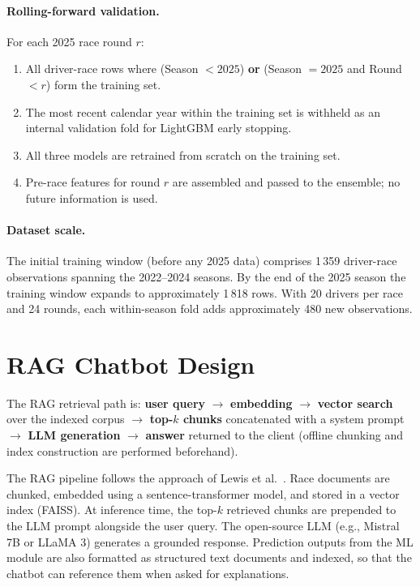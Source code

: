 \documentclass[12pt, a4paper, oneside]{report}
\begin{document}
\paragraph{Rolling-forward validation.}
For each 2025 race round $r$:
\begin{enumerate}[leftmargin=*]
  \item All driver-race rows where (Season $< 2025$) \textbf{or}
        (Season $= 2025$ and Round $< r$) form the training set.
  \item The most recent calendar year within the training set is withheld as
        an internal validation fold for LightGBM early stopping.
  \item All three models are retrained from scratch on the training set.
  \item Pre-race features for round $r$ are assembled and passed to the
        ensemble; no future information is used.
\end{enumerate}

\paragraph{Dataset scale.}
The initial training window (before any 2025 data) comprises 1\,359 driver-race
observations spanning the 2022--2024 seasons. By the end of the 2025 season the
training window expands to approximately 1\,818 rows. With 20 drivers per race
and 24 rounds, each within-season fold adds approximately 480 new observations.

\section{RAG Chatbot Design}

The RAG retrieval path is: \textbf{user query} $\rightarrow$ \textbf{embedding}
$\rightarrow$ \textbf{vector search} over the indexed corpus $\rightarrow$
\textbf{top-$k$ chunks} concatenated with a system prompt $\rightarrow$
\textbf{LLM generation} $\rightarrow$ \textbf{answer} returned to the client
(offline chunking and index construction are performed beforehand).

The RAG pipeline follows the approach of Lewis et al.~\cite{lewisRAG2020}.
Race documents are chunked, embedded using a sentence-transformer model, and
stored in a vector index (FAISS). At inference time, the top-$k$ retrieved
chunks are prepended to the LLM prompt alongside the user query. The open-source
LLM (e.g., Mistral 7B or LLaMA 3) generates a grounded response. Prediction
outputs from the ML module are also formatted as structured text documents and
indexed, so that the chatbot can reference them when asked for explanations.
\end{document}

